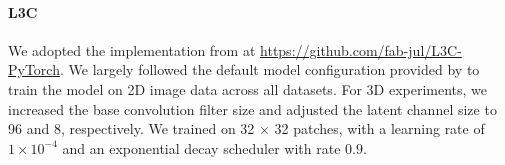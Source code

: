 \paragraph{L3C} 
We adopted the implementation from \citet{mentzer2019practical} at \url{https://github.com/fab-jul/L3C-PyTorch}.
We largely followed the default model configuration provided by \citep{mentzer2019practical} to train the model on 2D image data across all datasets. For 3D experiments, we increased the base convolution filter size and adjusted the latent channel size to 96 and 8, respectively. 
We trained on 32 $\times$ 32 patches, with
a learning rate of $1\times 10^{-4}$ and an exponential decay scheduler with rate $0.9$. 


